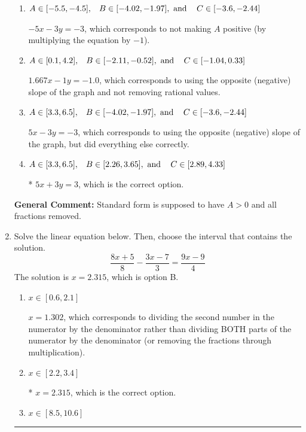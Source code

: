 \documentclass{extbook}[14pt]
\newcommand{\litem}[1]{\item #1

\rule{\textwidth}{0.4pt}}
\begin{document}
\begin{enumerate}
{\begin{enumerate}[label=\Alph*.]
 $1.667x + 1y = 1.0$, which corresponds to not removing rational values for Standard Form.
\item \( A \in [-5.5, -4.5], \hspace{3mm} B \in [-4.02, -1.97], \text{ and } \hspace{3mm} C \in [-3.6, -2.44] \)

 $-5x - 3y = -3$, which corresponds to not making $A$ positive (by multiplying the equation by $-1$).
\item \( A \in [0.1, 4.2], \hspace{3mm} B \in [-2.11, -0.52], \text{ and } \hspace{3mm} C \in [-1.04, 0.33] \)

 $1.667x - 1y = -1.0$, which corresponds to using the opposite (negative) slope of the graph and not removing rational values.
\item \( A \in [3.3, 6.5], \hspace{3mm} B \in [-4.02, -1.97], \text{ and } \hspace{3mm} C \in [-3.6, -2.44] \)

 $5x - 3y = -3$, which corresponds to using the opposite (negative) slope of the graph, but did everything else correctly.
\item \( A \in [3.3, 6.5], \hspace{3mm} B \in [2.26, 3.65], \text{ and } \hspace{3mm} C \in [2.89, 4.33] \)

* $5x + 3y = 3$, which is the correct option.
\end{enumerate}

\textbf{General Comment:} Standard form is supposed to have $A > 0$ and all fractions removed.
}
\litem{
Solve the linear equation below. Then, choose the interval that contains the solution.
\[ \frac{8x + 5}{8} - \frac{3x -7}{3} = \frac{9x -9}{4} \]The solution is \( x = 2.315 \), which is option B.\begin{enumerate}[label=\Alph*.]
\item \( x \in [0.6, 2.1] \)

 $x = 1.302$, which corresponds to dividing the second number in the numerator by the denominator rather than dividing BOTH parts of the numerator by the denominator (or removing the fractions through multiplication).
\item \( x \in [2.2, 3.4] \)

* $x = 2.315$, which is the correct option.
\item \( x \in [8.5, 10.6] \)


\end{enumerate}}
\end{enumerate}
\end{document}
